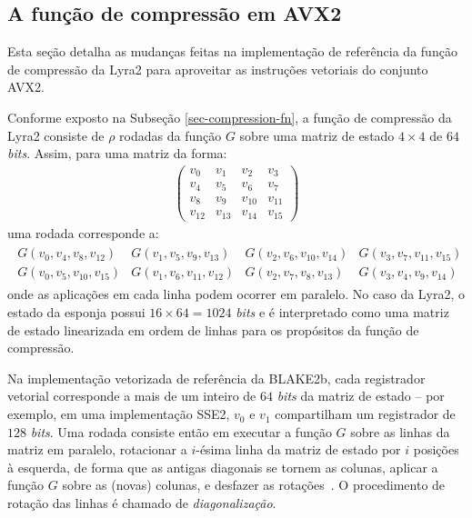 \documentclass{article}
\begin{document}
\subsection{A função de compressão em AVX2 }\label{sec-compression-fn-avx2}

Esta seção detalha as mudanças feitas na implementação de referência da
função de compressão da Lyra2 para aproveitar as instruções vetoriais do
conjunto AVX2.

Conforme exposto na Subseção \ref{sec-compression-fn}, a função de
compressão da Lyra2 consiste de $\rho$ rodadas da função $G$ sobre uma
matriz de estado $4 \times 4$ de $64$ \emph{bits}. Assim, para uma matriz
da forma:
\begin{align*}
\left(
\begin{matrix}
v_{0} & v_{1} & v_{2} & v_{3} \\
v_{4} & v_{5} & v_{6} & v_{7} \\
v_{8} & v_{9} & v_{10} & v_{11} \\
v_{12} & v_{13} & v_{14} & v_{15}
\end{matrix}
\right)
\end{align*}
uma rodada corresponde a:
\begin{align*}
\begin{matrix}
G(v_{0}, v_{4}, v_{8}, v_{12}) & G(v_{1}, v_{5}, v_{9}, v_{13}) & G(v_{2}, v_{6}, v_{10}, v_{14}) & G(v_{3}, v_{7}, v_{11}, v_{15}) \\
G(v_{0}, v_{5}, v_{10}, v_{15}) & G(v_{1}, v_{6}, v_{11}, v_{12}) & G(v_{2}, v_{7}, v_{8}, v_{13}) & G(v_{3}, v_{4}, v_{9}, v_{14})
\end{matrix}
\end{align*}
onde as aplicações em cada linha podem ocorrer em paralelo. No caso da
Lyra2, o estado da esponja possui $16 \times 64 = 1024$ \emph{bits} e é
interpretado como uma matriz de estado linearizada em ordem de linhas
para os propósitos da função de compressão.

Na implementação vetorizada de referência da BLAKE2b, cada registrador
vetorial corresponde a mais de um inteiro de $64$ \emph{bits} da matriz de
estado -- por exemplo, em uma implementação SSE2, $v_{0}$ e $v_{1}$
compartilham um registrador de $128$ \emph{bits}. Uma rodada consiste então
em executar a função $G$ sobre as linhas da matriz em paralelo, rotacionar
a $i$-ésima linha da matriz de estado por $i$ posições à esquerda, de forma
que as antigas diagonais se tornem as colunas, aplicar a função $G$ sobre
as (novas) colunas, e desfazer as rotações~\cite{blake2b}. O
procedimento de rotação das linhas é chamado de \emph{diagonalização}.
\end{document}
